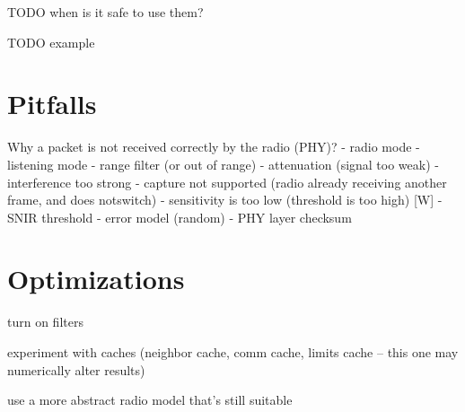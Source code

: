 TODO when is it safe to use them?

TODO example

\section{Pitfalls}

Why a packet is not received correctly by the radio (PHY)?
- radio mode
- listening mode
- range filter (or out of range)
- attenuation (signal too weak)
- interference too strong
- capture not supported (radio already receiving another frame, and does notswitch)
- sensitivity is too low (threshold is too high) [W]
- SNIR threshold
- error model (random)
- PHY layer checksum



\section{Optimizations}

turn on filters

experiment with caches (neighbor cache, comm cache, limits cache -- this one
may numerically alter results) 

use a more abstract radio model that's still suitable


